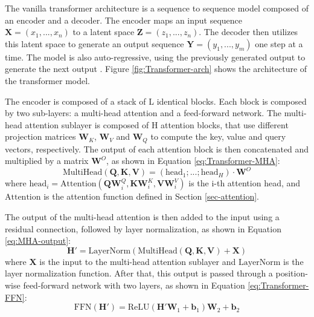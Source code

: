 The vanilla transformer architecture is a sequence to sequence model composed of an encoder and a decoder. The encoder maps an input sequence $\boldsymbol{X} = (x_1,...,x_n)$ to a latent space $\boldsymbol{Z} = (z_1,...,z_n)$. The decoder then utilizes this latent space to generate an output sequence $\boldsymbol{Y} = (y_1,...,y_m)$ one step at a time. The model is also auto-regressive, using the previously generated output to generate the next output \cite{vaswani2023attentionneed}. Figure \ref{fig:Transformer-arch} shows the architecture of the transformer model.

The encoder is composed of a stack of L identical blocks. Each block is composed by two sub-layers: a multi-head attention and a feed-forward network. The multi-head attention sublayer is composed of H attention blocks, that use different projection matrices $\boldsymbol{W}_K$, $\boldsymbol{W}_V$ and $\boldsymbol{W}_Q$ to compute the key, value and query vectors, respectively. The output of each attention block is then concatenated and multiplied by a matrix $\boldsymbol{W}^O$, as shown in Equation \ref{eq:Transformer-MHA}:
\begin{equation}
    \text{MultiHead}(\boldsymbol{Q}, \boldsymbol{K}, \boldsymbol{V}) = \left(\text{head}_1;...;\text{head}_H\right) \cdot \boldsymbol{W}^O 
    \label{eq:Transformer-MHA}
\end{equation}
where $\text{head}_i = \text{Attention}(\boldsymbol{Q}\boldsymbol{W}_{i}^{Q}, \boldsymbol{K}\boldsymbol{W}_{i}^{K}, \boldsymbol{V}\boldsymbol{W}_{i}^{V})$ is the i-th attention head, and $\text{Attention}$ is the attention function defined in Section \ref{sec-attention}. 

The output of the multi-head attention is then added to the input using a residual connection, followed by layer normalization, as shown in Equation \ref{eq:MHA-output}:
\begin{equation}
    \boldsymbol{H}' = \text{LayerNorm}(\text{MultiHead}(\boldsymbol{Q}, \boldsymbol{K}, \boldsymbol{V}) + \boldsymbol{X})
\end{equation}
where $\boldsymbol{X}$ is the input to the multi-head attention sublayer and $\text{LayerNorm}$ is the layer normalization function. After that, this output is passed through a position-wise feed-forward network with two layers, as shown in Equation \ref{eq:Transformer-FFN}:
\begin{equation}
    \text{FFN}(\boldsymbol{H}') = \text{ReLU}(\boldsymbol{H}'\boldsymbol{W}_1 + \boldsymbol{b}_1)\boldsymbol{W}_2 + \boldsymbol{b}_2
    \label{eq:Transformer-FFN}
\end{equation}

